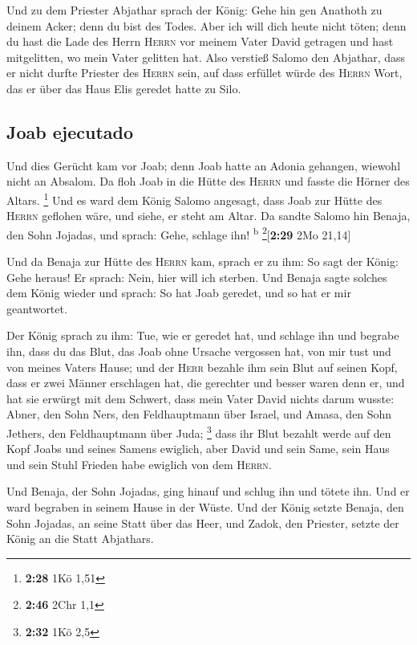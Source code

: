  Und zu dem Priester Abjathar sprach der König: Gehe hin
gen Anathoth zu deinem Acker; denn du bist des Todes. Aber ich will dich
heute nicht töten; denn du hast die Lade des Herrn \textsc{Herrn} vor
meinem Vater David getragen und hast mitgelitten, wo mein Vater gelitten
hat.  Also verstieß Salomo den Abjathar, dass er nicht
durfte Priester des \textsc{Herrn} sein, auf dass erfüllet würde des
\textsc{Herrn} Wort, das er über das Haus Elis geredet hatte zu Silo.

\hypertarget{joab-ejecutado}{%
\subsection{Joab ejecutado}\label{joab-ejecutado}}

 Und dies Gerücht kam vor Joab; denn Joab hatte an Adonia
gehangen, wiewohl nicht an Absalom. Da floh Joab in die Hütte des
\textsc{Herrn} und fasste die Hörner des Altars. \footnote{\textbf{2:28}
  1Kö 1,51}  Und es ward dem König Salomo angesagt, dass
Joab zur Hütte des \textsc{Herrn} geflohen wäre, und siehe, er steht am
Altar. Da sandte Salomo hin Benaja, den Sohn Jojadas, und sprach: Gehe,
schlage ihn! \textsuperscript{b} \footnote{\textbf{2:46} 2Chr 1,1}{[}\textbf{2:29}
2Mo 21,14{]}

 Und da Benaja zur Hütte des \textsc{Herrn} kam, sprach
er zu ihm: So sagt der König: Gehe heraus! Er sprach: Nein, hier will
ich sterben. Und Benaja sagte solches dem König wieder und sprach: So
hat Joab geredet, und so hat er mir geantwortet.

 Der König sprach zu ihm: Tue, wie er geredet hat, und
schlage ihn und begrabe ihn, dass du das Blut, das Joab ohne Ursache
vergossen hat, von mir tust und von meines Vaters Hause; 
und der \textsc{Herr} bezahle ihm sein Blut auf seinen Kopf, dass er
zwei Männer erschlagen hat, die gerechter und besser waren denn er, und
hat sie erwürgt mit dem Schwert, dass mein Vater David nichts darum
wusste: Abner, den Sohn Ners, den Feldhauptmann über Israel, und Amasa,
den Sohn Jethers, den Feldhauptmann über Juda; \footnote{\textbf{2:32}
  1Kö 2,5}  dass ihr Blut bezahlt werde auf den Kopf
Joabs und seines Samens ewiglich, aber David und sein Same, sein Haus
und sein Stuhl Frieden habe ewiglich von dem \textsc{Herrn}.

 Und Benaja, der Sohn Jojadas, ging hinauf und schlug ihn
und tötete ihn. Und er ward begraben in seinem Hause in der Wüste.
 Und der König setzte Benaja, den Sohn Jojadas, an seine
Statt über das Heer, und Zadok, den Priester, setzte der König an die
Statt Abjathars.

